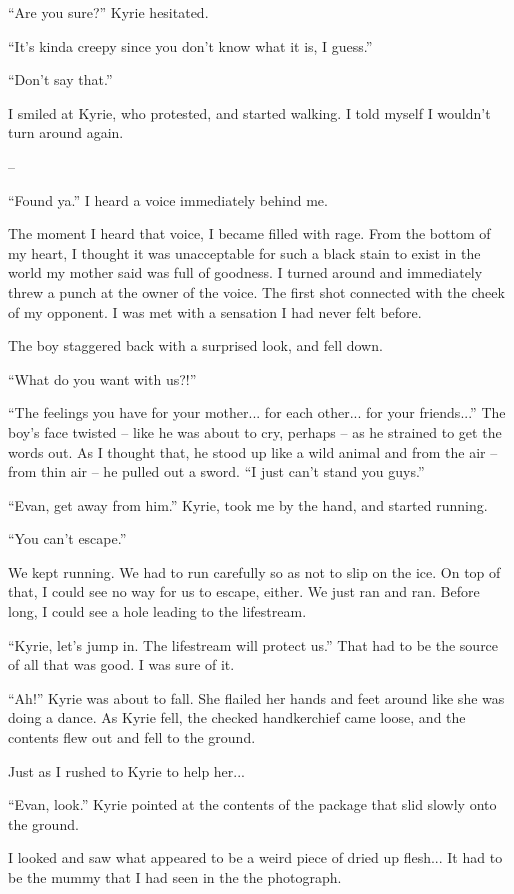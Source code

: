 \documentclass[oneside]{book}
\begin{document}
“Are you sure?” Kyrie hesitated.

“It’s kinda creepy since you don’t know what it is, I guess.”

“Don’t say that.”

I smiled at Kyrie, who protested, and started walking. I told myself I wouldn’t turn around again.

–

“Found ya.” I heard a voice immediately behind me.

The moment I heard that voice, I became filled with rage. From the bottom of my heart, I thought it was unacceptable for such a black stain to exist in the world my mother said was full of goodness. I turned around and immediately threw a punch at the owner of the voice. The first shot connected with the cheek of my opponent. I was met with a sensation I had never felt before.

The boy staggered back with a surprised look, and fell down.

“What do you want with us?!”

“The feelings you have for your mother... for each other... for your friends...” The boy’s face twisted – like he was about to cry, perhaps – as he strained to get the words out. As I thought that, he stood up like a wild animal and from the air – from thin air – he pulled out a sword. “I just can’t stand you guys.”

“Evan, get away from him.” Kyrie, took me by the hand, and started running.

“You can’t escape.”

We kept running. We had to run carefully so as not to slip on the ice. On top of that, I could see no way for us to escape, either. We just ran and ran. Before long, I could see a hole leading to the lifestream.

“Kyrie, let’s jump in. The lifestream will protect us.” That had to be the source of all that was good. I was sure of it.

“Ah!” Kyrie was about to fall. She flailed her hands and feet around like she was doing a dance. As Kyrie fell, the checked handkerchief came loose, and the contents flew out and fell to the ground.

Just as I rushed to Kyrie to help her...

“Evan, look.” Kyrie pointed at the contents of the package that slid slowly onto the ground.

I looked and saw what appeared to be a weird piece of dried up flesh... It had to be the mummy that I had seen in the the photograph.
\end{document}

